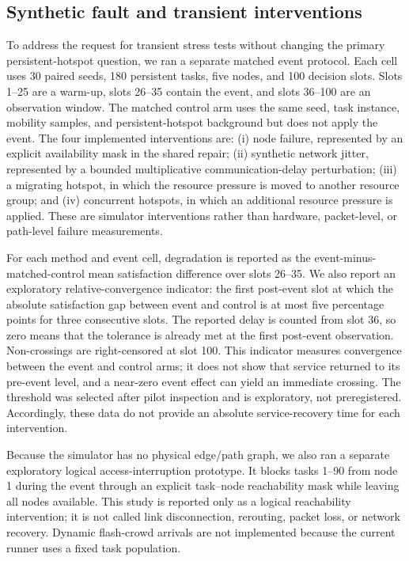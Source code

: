 \documentclass[preprint,12pt]{elsarticle}
\begin{document}
\subsection{Synthetic fault and transient interventions}\label{fault-transient-interventions}

To address the request for transient stress tests without changing the
primary persistent-hotspot question, we ran a separate matched event protocol.
Each cell uses 30 paired seeds, 180 persistent tasks, five nodes, and 100
decision slots. Slots 1--25 are a warm-up, slots 26--35 contain the event, and
slots 36--100 are an observation window. The matched control arm uses the same
seed, task instance, mobility samples, and persistent-hotspot background but
does not apply the event. The four implemented interventions are: (i) node
failure, represented by an explicit availability mask in the shared repair;
(ii) synthetic network jitter, represented by a bounded multiplicative
communication-delay perturbation; (iii) a migrating hotspot, in which the
resource pressure is moved to another resource group; and (iv) concurrent
hotspots, in which an additional resource pressure is applied. These are
simulator interventions rather than hardware, packet-level, or path-level
failure measurements.

For each method and event cell, degradation is reported as the event-minus-
matched-control mean satisfaction difference over slots 26--35. We also report
an exploratory relative-convergence indicator: the first post-event slot at
which the absolute satisfaction gap between event and control is at most five
percentage points for three consecutive slots. The reported delay is counted
from slot 36, so zero means that the tolerance is already met at the first
post-event observation. Non-crossings are right-censored at slot 100. This
indicator measures convergence between the event and control arms; it does not
show that service returned to its pre-event level, and a near-zero event effect
can yield an immediate crossing. The threshold was selected after pilot
inspection and is exploratory, not preregistered. Accordingly, these data do
not provide an absolute service-recovery time for each intervention.

Because the simulator has no physical edge/path graph, we also ran a separate
exploratory logical access-interruption prototype. It blocks tasks 1--90 from
node 1 during the event through an explicit task--node reachability mask while
leaving all nodes available. This study is reported only as a logical
reachability intervention; it is not called link disconnection, rerouting,
packet loss, or network recovery. Dynamic flash-crowd arrivals are not
implemented because the current runner uses a fixed task population.
\end{document}

